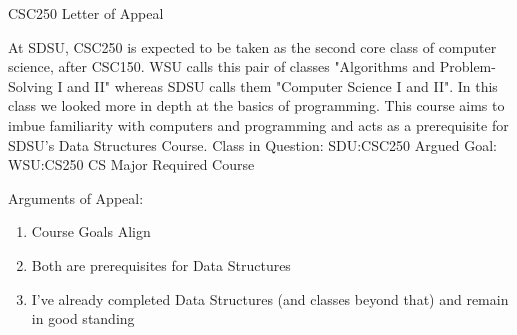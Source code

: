 \documentclass{article}
\begin{document}
\begin{center}
	CSC250 Letter of Appeal
\end{center}

At SDSU, CSC250 is expected to be taken as the second core class of computer science, after CSC150. WSU calls this pair of classes "Algorithms and Problem-Solving I and II" whereas SDSU calls them "Computer Science I and II". In this class we looked more in depth at the basics of programming. This course aims to imbue familiarity with computers and programming and acts as a prerequisite for SDSU's Data Structures Course.
\newline
Class in Question: SDU:CSC250
\newline
Argued Goal: WSU:CS250 CS Major Required Course

Arguments of Appeal:
\begin{enumerate}
	\item Course Goals Align
	\item Both are prerequisites for Data Structures
	\item I've already completed Data Structures (and classes beyond that) and remain in good standing
\end{enumerate}

\end{document}
